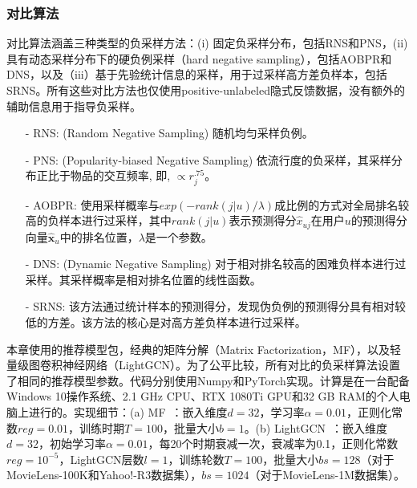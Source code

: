 \subsubsection{对比算法}
对比算法涵盖三种类型的负采样方法：(i) 固定负采样分布，包括\textsf{RNS}\cite{Steffen:2009:UAI,Xiangnan:2020:SIGIR,Weike:2013:IJCAI,Yu:2018:CIKM,Wang:2019:SIGIR,Xuejiao:2020:ASC}和\textsf{PNS}\cite{Mikolov:2013:NIPS,Chen:2017:KDD,Tang:2015:WWW}，(ii)具有动态采样分布下的硬负例采样（hard negative sampling），包括\textsf{AOBPR}\cite{Steffen:2014:WSDM}和\textsf{DNS}\cite{Zhang:2013:SIGIR}，以及（iii）基于先验统计信息的采样，用于过采样高方差负样本，包括\textsf{SRNS}\cite{Ding:2020:NIPS}。所有这些对比方法也仅使用positive-unlabeled隐式反馈数据，没有额外的辅助信息用于指导负采样。
\begin{itemize}
	\item[-]\textsf{RNS}\cite{Steffen:2009:UAI,Xiangnan:2020:SIGIR,Weike:2013:IJCAI,Yu:2018:CIKM,Wang:2019:SIGIR,Xuejiao:2020:ASC}: (Random Negative Sampling) 随机均匀采样负例。
	\item[-]\textsf{PNS}\cite{Mikolov:2013:NIPS,Chen:2017:KDD,Tang:2015:WWW}: (Popularity-biased Negative Sampling) 依流行度的负采样，其采样分布正比于物品的交互频率, 即, $\propto r_j ^{.75}$。
	\item[-]\textsf{AOBPR}\cite{Steffen:2014:WSDM}: 使用采样概率与$ exp(-rank(j|u)/\lambda)$成比例的方式对全局排名较高的负样本进行过采样，其中$rank(j|u)$表示预测得分$\hat{x}_{uj}$在用户$u$的预测得分向量$\hat{\mathbf{x}}_u$中的排名位置，$\lambda$是一个参数。
	\item[-]\textsf{DNS}\cite{Zhang:2013:SIGIR}: (Dynamic Negative Sampling) 对于相对排名较高的困难负样本进行过采样。其采样概率是相对排名位置的线性函数。
	\item[-]\textsf{SRNS}\cite{Ding:2020:NIPS}: 该方法通过统计样本的预测得分，发现伪负例的预测得分具有相对较低的方差。该方法的核心是对高方差负样本进行过采样。
\end{itemize}
本章使用的推荐模型包，经典的矩阵分解（Matrix Factorization，MF），以及轻量级图卷积神经网络（LightGCN）\cite{Xiangnan:2020:SIGIR}。为了公平比较，所有对比的负采样算法设置了相同的推荐模型参数。代码分别使用Numpy和PyTorch实现。计算是在一台配备Windows 10操作系统、2.1 GHz CPU、RTX 1080Ti GPU和32 GB RAM的个人电脑上进行的。实现细节：(a) MF~\cite{Xiangnan:2016SIGIR}：嵌入维度$d=32$，学习率$\alpha=0.01$，正则化常数$reg=0.01$，训练时期$T=100$，批量大小$b=1$。(b) LightGCN~\cite{Xiangnan:2020:SIGIR}：嵌入维度$d=32$，初始学习率$\alpha=0.01$，每20个时期衰减一次，衰减率为0.1，正则化常数$reg=10^{-5}$，LightGCN层数$l=1$，训练轮数$T=100$，批量大小$bs=128$（对于MovieLens-100K和Yahoo!-R3数据集），$bs=1024$（对于MovieLens-1M数据集）。
